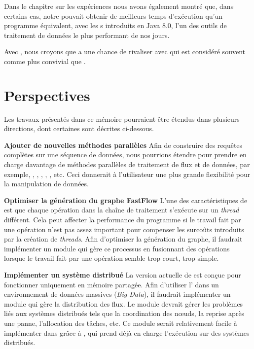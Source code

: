 \begin{conclusion}
Dans le chapitre sur les exp\'eriences nous avons \'egalement montr\'e que, dans certains cas, notre  pouvait obtenir de meilleurs temps d'ex\'ecution qu'un programme  \'equivalent, avec les s introduits en Java 8.0, l'un des outils de traitement de donn\'ees le plus performant de nos jours.

Avec , nous croyons que  a une chance de rivaliser avec  qui est consid\'er\'e souvent comme plus convivial que . 


\section*{\textbf{Perspectives}}

Les travaux pr\'esent\'es dans ce m\'emoire pourraient \^etre \'etendus dans plusieurs directions, dont certaines sont d\'ecrites ci-dessous.

\textbf{Ajouter de nouvelles m\'ethodes parall\`eles} Afin de construire des requ\^etes compl\`etes sur une s\'equence de donn\'ees, nous pourrions \'etendre  pour prendre en charge davantage de m\'ethodes parall\`eles de traitement de flux et de donn\'ees, par exemple, , , , , , etc. Ceci donnerait \`a l'utilisateur une plus grande flexibilit\'e pour la manipulation de donn\'ees.

\textbf{Optimiser la génération du graphe FastFlow} L'une des caract\'eristiques de  est que chaque op\'eration dans la cha\^ine de traitement s'ex\'ecute sur un \emph{thread} diff\'erent. Cela peut affecter la performance du programme si le travail fait par une op\'eration n'est pas assez important pour compenser les surco\^uts introduits par la cr\'eation de \emph{threads}. Afin d'optimiser la g\'en\'eration du graphe, il faudrait impl\'ementer un module qui g\`ere ce processus en fusionnant des op\'erations lorsque le travail fait par une op\'eration semble trop court, trop simple.

\textbf{Impl\'ementer un syst\`eme distribu\'e} La version actuelle de  est con\c{c}ue pour fonctionner uniquement en m\'emoire partag\'ee. Afin d'utiliser l' dans un environnement de donn\'ees massives (\emph{Big Data}), il faudrait impl\'ementer un module qui g\`ere la distribution des flux. Le module devrait g\'erer les probl\`emes li\'es aux syst\`emes distribu\'es tels que la coordination des nœuds, la reprise apr\`es une panne, l'allocation des t\^aches, etc. Ce module serait relativement facile \`a impl\'ementer dans  gr\^ace \`a , qui prend d\'ej\`a en charge l'ex\'ecution sur des syst\`emes distribu\'es.


\end{conclusion}




